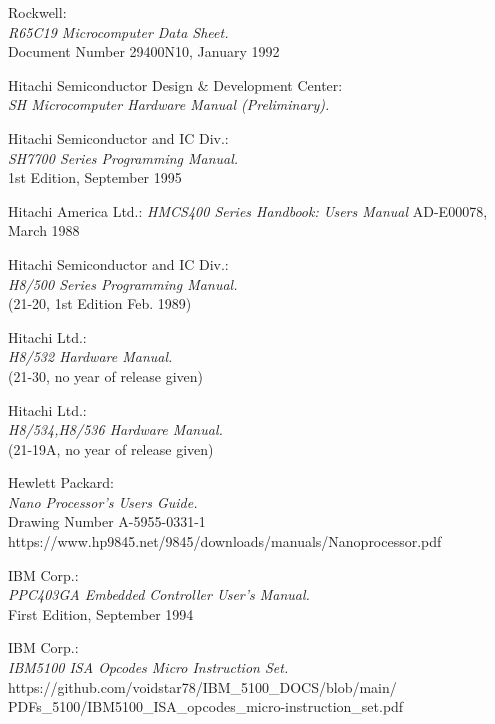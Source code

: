  Rockwell: \\
                {\em R65C19 Microcomputer Data Sheet.\/} \\
                Document Number 29400N10, January 1992

 Hitachi Semiconductor Design \& Development Center: \\
                 {\em SH Microcomputer Hardware Manual
                 (Preliminary).\/}

 Hitachi Semiconductor and IC Div.: \\
                 {\em SH7700 Series Programming Manual.\/} \\
                 1st Edition, September 1995

 Hitachi America Ltd.:
                 {\em HMCS400 Series Handbook: Users Manual\/}
                 AD-E00078, March 1988

 Hitachi Semiconductor and IC Div.: \\
                  {\em H8/500 Series Programming Manual.\/} \\
        	  (21-20, 1st Edition Feb. 1989)

 Hitachi Ltd.: \\
                    {\em H8/532 Hardware Manual.\/} \\
		    (21-30, no year of release given)

 Hitachi Ltd.: \\
                    {\em H8/534,H8/536 Hardware Manual.\/} \\
		    (21-19A, no year of release given)

 Hewlett Packard: \\
                 { \em Nano Processor's Users Guide.\/} \\
                 Drawing Number A-5955-0331-1 \\
                 https://www.hp9845.net/9845/downloads/manuals/Nanoprocessor.pdf

 IBM Corp.: \\
	         {\em PPC403GA Embedded Controller User's Manual.\/} \\
                 First Edition, September 1994

 IBM Corp.: \\
                 {\em IBM5100 ISA Opcodes Micro Instruction Set.\/} \\
                 https://github.com/voidstar78/IBM\_5100\_DOCS/blob/main/ \\
                 PDFs\_5100/IBM5100\_ISA\_opcodes\_micro-instruction\_set.pdf

